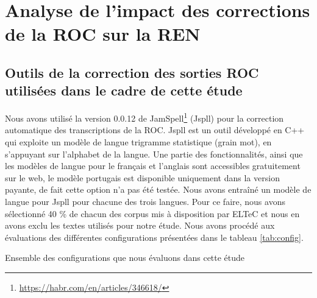 
\section{Analyse de l'impact des corrections de la ROC sur la REN}
\label{sec:COR-OCR-IMPACT-NER}

\subsection{Outils de la correction des sorties ROC utilisées dans le cadre de cette étude}
\label{subsec:outils_COR-OCR-IMPACT-NER}
Nous avons utilisé la version 0.0.12 de JamSpell\footnote{\url{https://habr.com/en/articles/346618/}} (Jspll) pour la correction automatique des transcriptions de la ROC. Jspll est un outil développé en C++ qui exploite un modèle de langue trigramme statistique
 (grain mot), en s'appuyant sur l'alphabet de la langue. Une partie des fonctionnalités, ainsi que les modèles de langue pour le français et l'anglais sont accessibles gratuitement sur le web, le modèle portugais est disponible uniquement dans la version payante, de fait cette option n'a pas été testée.
Nous avons entraîné un modèle de langue pour Jspll pour chacune des trois langues. Pour ce faire, nous avons sélectionné 40 \% de chacun des corpus mis à disposition par ELTeC
 et nous en avons exclu les textes utilisés pour notre étude. Nous avons procédé aux évaluations des différentes configurations présentées dans le tableau \ref{tab:config}.

\begin{table}[h!]
    \centering
   
    \caption{Ensemble des configurations que nous évaluons dans cette étude}
    \label{tab:config}
\end{table}


